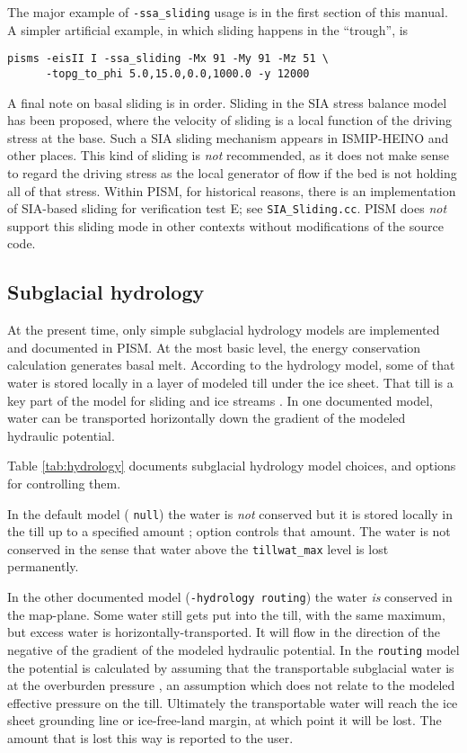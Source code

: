 The major example of \texttt{-ssa_sliding} usage is in the first section of this manual.  A simpler artificial example, in which sliding happens in the ``trough'', is
\begin{verbatim}
pisms -eisII I -ssa_sliding -Mx 91 -My 91 -Mz 51 \
      -topg_to_phi 5.0,15.0,0.0,1000.0 -y 12000
\end{verbatim}

A final note on basal sliding is in order.  Sliding in the SIA stress balance model has been proposed, where the velocity of sliding is a local function of the driving stress at the base.  Such a SIA sliding mechanism appears in ISMIP-HEINO \cite{Calovetal2009HEINOfinal} and other places.  This kind of sliding is \emph{not} recommended, as it does not make sense to regard the driving stress as the local generator of flow if the bed is not holding all of that stress.  Within PISM, for historical reasons, there is an implementation of SIA-based sliding for verification test E; see \texttt{SIA_Sliding.cc}.  PISM does \emph{not} support this sliding mode in other contexts without modifications of the source code.


\subsection{Subglacial hydrology}  \label{subsect:subhydro}

At the present time, only simple subglacial hydrology models are implemented and documented in PISM.  At the most basic level, the energy conservation calculation generates basal melt.  According to the hydrology model, some of that water is stored locally in a layer of modeled till under the ice sheet.  That till is a key part of the model for sliding and ice streams \cite{Clarke05,SchoofTill,SchoofStream}.  In one documented model, water can be transported horizontally down the gradient of the modeled hydraulic potential.

Table \ref{tab:hydrology} documents subglacial hydrology model choices, and options for controlling them.

In the default model ( \texttt{null}) the water is \emph{not} conserved but it is stored locally in the till up to a specified amount \cite{BBssasliding}; option  controls that amount.  The water is not conserved in the sense that water above the \texttt{tillwat_max} level is lost permanently.

In the other documented model (\texttt{-hydrology routing}) the water \emph{is} conserved in the map-plane.  Some water still gets put into the till, with the same maximum, but excess water is horizontally-transported.  It will flow in the direction of the negative of the gradient of the modeled hydraulic potential.  In the \texttt{routing} model the potential is calculated by assuming that the transportable subglacial water is at the overburden pressure \cite{Siegertetal2009}, an assumption which does not relate to the modeled effective pressure on the till.  Ultimately the transportable water will reach the ice sheet grounding line or ice-free-land margin, at which point it will be lost.  The amount that is lost this way is reported to the user.


